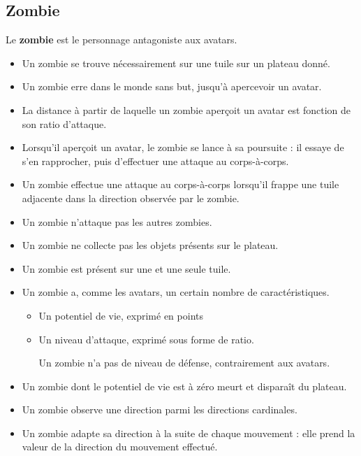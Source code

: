 \subsection{Zombie}
Le \textbf{zombie} est le personnage antagoniste aux avatars.
    \begin{itemize}
        \item Un zombie se trouve nécessairement sur une tuile sur un plateau donné.
        \item Un zombie erre dans le monde sans but, jusqu'à apercevoir un avatar.
        \item La distance à partir de laquelle un zombie aperçoit un avatar est fonction de son ratio d'attaque.
        \item Lorsqu'il aperçoit un avatar, le zombie se lance à sa poursuite : il essaye de s'en rapprocher, puis d'effectuer une attaque au corps-à-corps.
        \item Un zombie effectue une attaque au corps-à-corps lorsqu'il frappe une tuile adjacente dans la direction observée par le zombie.
        \item Un zombie n'attaque pas les autres zombies.
        \item Un zombie ne collecte pas les objets présents sur le plateau.
        \item Un zombie est présent sur une et une seule tuile.
        \item Un zombie a, comme les avatars, un certain nombre de caractéristiques.
        \begin{itemize}
            \item Un potentiel de vie, exprimé en points
            \item Un niveau d'attaque, exprimé sous forme de ratio.
            \begin{tcolorbox}
                Un zombie n'a pas de niveau de défense, contrairement aux avatars.
            \end{tcolorbox}
        \end{itemize}
        \item Un zombie dont le potentiel de vie est à zéro meurt et disparaît du plateau.
        \item Un zombie observe une direction parmi les directions cardinales.
        \item Un zombie adapte sa direction à la suite de chaque mouvement : elle prend la valeur de la direction du mouvement effectué.
      \end{itemize}
      
